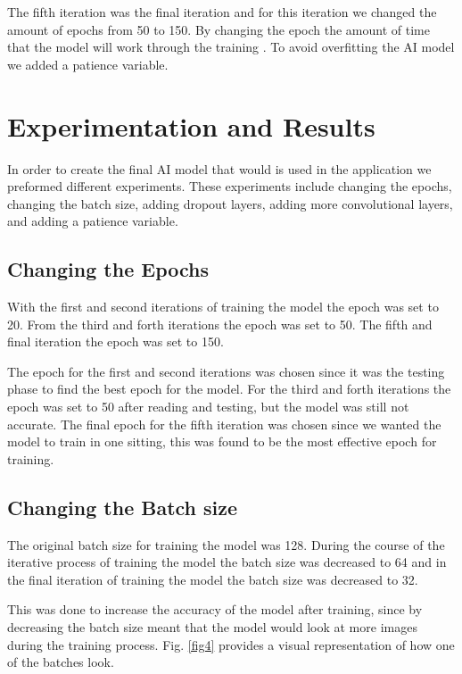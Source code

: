 \documentclass[conference]{IEEEtran}
\begin{document}
The fifth iteration was the final iteration and for this iteration we changed the amount of epochs from 50 to 150. By changing the epoch the amount of time that the model will work through the training \cite{b4}. To avoid overfitting the AI model we added a patience variable. 

\section{Experimentation and Results}

In order to create the final AI model that would is used in the application we preformed different experiments. These experiments include changing the epochs, changing the batch size, adding dropout layers, adding more convolutional layers, and adding a patience variable.

\subsection{Changing the Epochs}

With the first and second iterations of training the model the epoch was set to 20. From the third and forth iterations the epoch was set to 50. The fifth and final iteration the epoch was set to 150.

The epoch for the first and second iterations was chosen since it was the testing phase to find the best epoch for the model. For the third and forth iterations the epoch was set to 50 after reading \cite{b4} and testing, but the model was still not accurate. The final epoch for the fifth iteration was chosen since we wanted the model to train in one sitting, this was found to be the most effective epoch for training.

\subsection{Changing the Batch size}

The original batch size for training the model was 128. During the course of the iterative process of training the model the batch size was decreased to 64 and in the final iteration of training the model the batch size was decreased to 32.

This was done to increase the accuracy of the model after training, since by decreasing the batch size meant that the model would look at more images during the training process. Fig. \ref{fig4} provides a visual representation of how one of the batches look.
\end{document}
